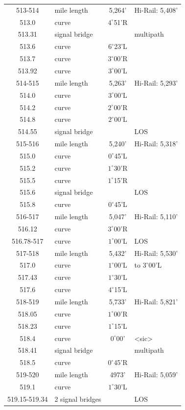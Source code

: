 \begin{center}
\begin{longtable}{c l c l}
513-514 & mile length & 5,264' &  Hi-Rail: 5,408' \\
	513.0&curve&$4^{\circ}$51'R&\\
	513.31&signal bridge& &multipath\\
	513.6&curve&$6^{\circ}$23'L&\\
	513.7&curve&$3^{\circ}$00'R&\\
	513.92&curve&$3^{\circ}$00'L&\\
514-515 & mile length & 5,263' &  Hi-Rail: 5,293' \\
	514.0   &curve&$3^{\circ}$00'L& \\
	514.2   &curve&$2^{\circ}$00'R& \\
	514.8   &curve&$2^{\circ}$00'L& \\
	514.55 &signal bridge& &LOS\\
515-516 & mile length & 5,240' &  Hi-Rail: 5,318' \\
	515.0 &curve&$0^{\circ}$45'L& \\
	515.2 &curve&$1^{\circ}$30'R& \\ 
	515.5 &curve&$1^{\circ}$15'R& \\
	515.6 &signal bridge& &LOS\\
	515.8 &curve&$0^{\circ}$45'L& \\
\hline
516-517 & mile length & 5,047' &  Hi-Rail: 5,110' \\	
	516.12&curve&$3^{\circ}$00'R&\\
	516.78-517&curve&$1^{\circ}$00'L&LOS\\
517-518 & mile length & 5,432' &  Hi-Rail: 5,530' \\
	517.0&curve&$1^{\circ}$00'L & to $3^{\circ}$00'L\\
	517.43&curve&$1^{\circ}$30'L&\\
	517.6&curve&$4^{\circ}$15'L&\\
518-519 & mile length & 5,733' &  Hi-Rail: 5,821' \\
	518.05&curve&$1^{\circ}$00'R&\\
	518.23&curve&$1^{\circ}$15'L&\\
	518.4&curve&$0^{\circ}$00'&<sic>\\
	518.41&signal bridge& &multipath\\
	518.5&curve&$0^{\circ}$45'R&\\
519-520 & mile length & 4973' &  Hi-Rail: 5,059' \\
	519.1&curve&$1^{\circ}$30'L&\\
	519.15-519.34&2 signal bridges & &LOS\\

\end{longtable}
\end{center}

